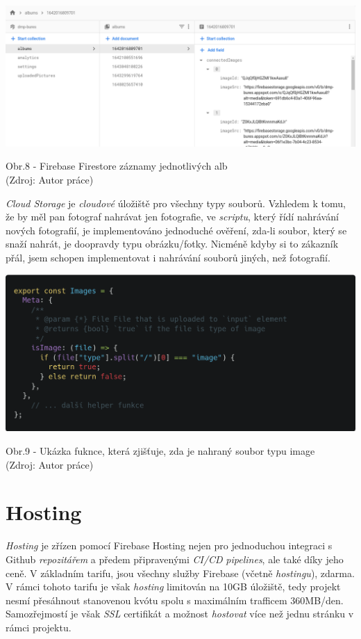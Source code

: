 \documentclass[12pt,a4paper]{report}
\begin{document}
  \vspace*{0.5cm}
  \noindent\includegraphics[width=\linewidth]{firestore.png}
  \begin{center}
    Obr.8 - Firebase Firestore záznamy jednotlivých alb \\
    (Zdroj: Autor práce)
  \end{center}

  \emph{Cloud Storage} je \emph{cloudové} úložiště pro všechny typy souborů. Vzhledem k tomu, že by měl pan
  fotograf nahrávat jen fotografie, ve \emph{scriptu}, který řídí nahrávání nových fotografií, je
  implementováno jednoduché ověření, zda-li soubor, který se snaží nahrát, je doopravdy typu
  obrázku/fotky. Nicméně kdyby si to zákazník přál, jsem schopen implementovat i nahrávání
  souborů jiných, než fotografií.

  \vspace*{0.5cm}
  \noindent\includegraphics[width=\linewidth]{imagesHelperCodeblock.png}
  \begin{center}
    Obr.9 - Ukázka fuknce, která zjišťuje, zda je nahraný soubor typu image \\
    (Zdroj: Autor práce)
  \end{center}
  \vspace*{0.5cm}

  \section{Hosting}
  \emph{Hosting} je zřízen pomocí Firebase Hosting nejen pro jednoduchou integraci s Github \emph{repozitářem}
  a předem připravenými \emph{CI/CD} \emph{pipelines}, ale také díky jeho ceně. V základním tarifu, jsou všechny služby
  Firebase (včetně \emph{hostingu}), zdarma. V rámci tohoto tarifu je však \emph{hosting} limitován na 10GB úložiště, tedy projekt 
  nesmí přesáhnout stanovenou kvótu spolu s maximálním trafficem 360MB/den. Samozřejmostí je však \emph{SSL} certifikát a možnost
  \emph{hostovat} více než jednu stránku v rámci projektu.
\end{document}
